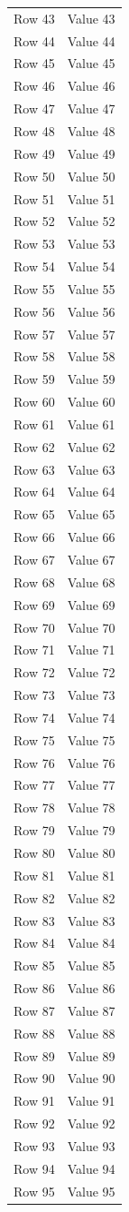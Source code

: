 \documentclass{article}
\begin{document}
\begin{longtable}{ll}
Row 43 & Value 43 \\
Row 44 & Value 44 \\
Row 45 & Value 45 \\
Row 46 & Value 46 \\
Row 47 & Value 47 \\
Row 48 & Value 48 \\
Row 49 & Value 49 \\
Row 50 & Value 50 \\
Row 51 & Value 51 \\
Row 52 & Value 52 \\
Row 53 & Value 53 \\
Row 54 & Value 54 \\
Row 55 & Value 55 \\
Row 56 & Value 56 \\
Row 57 & Value 57 \\
Row 58 & Value 58 \\
Row 59 & Value 59 \\
Row 60 & Value 60 \\
Row 61 & Value 61 \\
Row 62 & Value 62 \\
Row 63 & Value 63 \\
Row 64 & Value 64 \\
Row 65 & Value 65 \\
Row 66 & Value 66 \\
Row 67 & Value 67 \\
Row 68 & Value 68 \\
Row 69 & Value 69 \\
Row 70 & Value 70 \\
Row 71 & Value 71 \\
Row 72 & Value 72 \\
Row 73 & Value 73 \\
Row 74 & Value 74 \\
Row 75 & Value 75 \\
Row 76 & Value 76 \\
Row 77 & Value 77 \\
Row 78 & Value 78 \\
Row 79 & Value 79 \\
Row 80 & Value 80 \\
Row 81 & Value 81 \\
Row 82 & Value 82 \\
Row 83 & Value 83 \\
Row 84 & Value 84 \\
Row 85 & Value 85 \\
Row 86 & Value 86 \\
Row 87 & Value 87 \\
Row 88 & Value 88 \\
Row 89 & Value 89 \\
Row 90 & Value 90 \\
Row 91 & Value 91 \\
Row 92 & Value 92 \\
Row 93 & Value 93 \\
Row 94 & Value 94 \\
Row 95 & Value 95 \\
\end{longtable}
\end{document}
